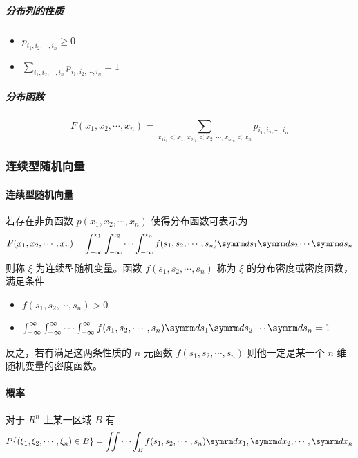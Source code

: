 \subparagraph{分布列的性质} 
\begin{itemize}[leftmargin=\paritemindent]
    \item $ p_{i_{1} , i_{2} , \cdots , i_{n} } \geqslant 0 $
    \item $ \sum_{i_{1} , i_{2} , \cdots , i_{n} } p_{i_{1} , i_{2} , \cdots , i_{n} } = 1 $
\end{itemize}

\subparagraph{分布函数}
\begin{equation}
    F(x_{1} , x_{2} , \cdots , x_{n} ) = \sum_{x_{1i_1} < x_1 , x_{2i_2} < x_2 , \cdots , x_{ni_n} < x_n } p_{i_{1} , i_{2} , \cdots , i_{n} }
\end{equation}

\subsubsection{连续型随机向量}

\paragraph{连续型随机向量} 若存在非负函数 $ p(x_{1} , x_{2} , \cdots , x_{n} ) $ 使得分布函数可表示为
$$ F(x_{1} , x_{2} , \cdots , x_{n} ) = \int_{-\infty}^{x_{1}}  \int_{-\infty}^{x_{2}}  \cdots  \int_{-\infty}^{x_{n}} 
f(s_{1} , s_{2} , \cdots , s_{n}) \diff s_{1} \diff s_{2} \cdots \diff s_{n}  $$ 
则称 $ \xi $ 为连续型随机变量。函数 $ f(s_{1} , s_{2} , \cdots , s_{n}) $ 称为 $ \xi $ 的分布密度或密度函数，满足条件
\begin{itemize}[leftmargin=\paritemindent]
    \item $ f(s_{1} , s_{2} , \cdots , s_{n}) > 0 $
    \item $ \int_{-\infty}^{\infty}  \int_{-\infty}^{\infty}  \cdots  \int_{-\infty}^{\infty} 
    f(s_{1} , s_{2} , \cdots , s_{n}) \diff s_{1} \diff s_{2} \cdots \diff s_{n} = 1$
\end{itemize}
反之，若有满足这两条性质的 $ n $ 元函数 $ f(s_{1} , s_{2} , \cdots , s_{n}) $ 则他一定是某一个 $ n $ 维随机变量的密度函数。

\paragraph{概率} 对于 $ R^n $ 上某一区域 $ B $ 有
\begin{equation}
    P\{ (\xi_{1} , \xi_{2} , \cdots , \xi_{n}) \in B \} = 
    \iint\cdots\int _B f(s_{1} , s_{2} , \cdots , s_{n}) \diff x_{1} , \diff x_{2} , \cdots , \diff x_{n} 
\end{equation}

